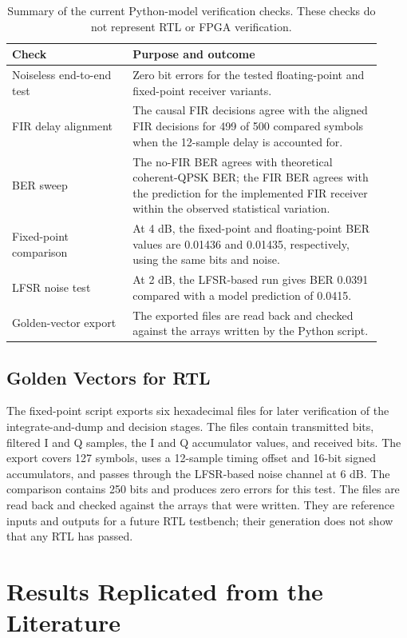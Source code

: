 \documentclass[10pt,twocolumn,letterpaper]{article}
\newcommand{\newstart}{\begingroup\color{blue}}
\newcommand{\newend}{\endgroup}
\begin{document}
\begin{table}[H]
\centering\color{blue}
\small
\begin{tabular}{@{}p{0.30\linewidth}p{0.62\linewidth}@{}}
\toprule
Check & Purpose and outcome \\
\midrule
Noiseless end-to-end test & Zero bit errors for the tested floating-point and fixed-point receiver variants. \\
FIR delay alignment & The causal FIR decisions agree with the aligned FIR decisions for 499 of 500 compared symbols when the 12-sample delay is accounted for. \\
BER sweep & The no-FIR BER agrees with theoretical coherent-QPSK BER; the FIR BER agrees with the prediction for the implemented FIR receiver within the observed statistical variation. \\
Fixed-point comparison & At 4 dB, the fixed-point and floating-point BER values are 0.01436 and 0.01435, respectively, using the same bits and noise. \\
LFSR noise test & At 2 dB, the LFSR-based run gives BER 0.0391 compared with a model prediction of 0.0415. \\
Golden-vector export & The exported files are read back and checked against the arrays written by the Python script. \\
\bottomrule
\end{tabular}
\caption{Summary of the current Python-model verification checks. These checks do not represent RTL or FPGA verification.}
\label{tab:checks}
\end{table}

\subsection{Golden Vectors for RTL}
The fixed-point script exports six hexadecimal files for later verification of the integrate-and-dump and decision stages. The files contain transmitted bits, filtered I and Q samples, the I and Q accumulator values, and received bits. The export covers 127 symbols, uses a 12-sample timing offset and 16-bit signed accumulators, and passes through the LFSR-based noise channel at 6 dB. The comparison contains 250 bits and produces zero errors for this test. The files are read back and checked against the arrays that were written. They are reference inputs and outputs for a future RTL testbench; their generation does not show that any RTL has passed.
\newend

\newstart
\section{Results Replicated from the Literature}
\end{document}
